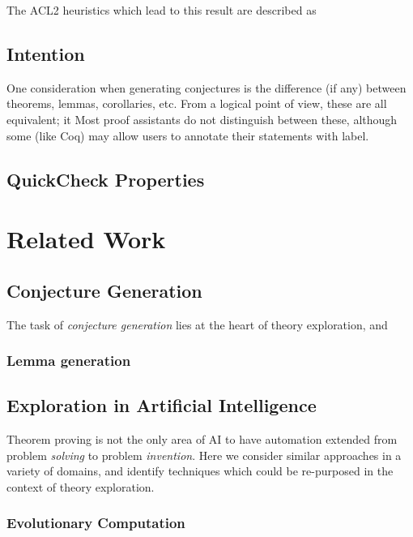 \documentclass[]{article}
\begin{document}
The ACL2 heuristics which lead to this result are described as

\subsection{Intention}

One consideration when generating conjectures is the difference (if any) between theorems, lemmas, corollaries, etc. From a logical point of view, these are all equivalent; it Most proof assistants do not distinguish between these, although some (like Coq) may allow users to annotate their statements with label.

\subsection{QuickCheck Properties}



\section{Related Work}
\label{related}

\subsection{Conjecture Generation}

The task of \emph{conjecture generation} lies at the heart of theory exploration, and

\subsubsection{Lemma generation}

\subsection{Exploration in Artificial Intelligence}

Theorem proving is not the only area of AI to have automation extended from problem \emph{solving} to problem \emph{invention}. Here we consider similar approaches in a variety of domains, and identify techniques which could be re-purposed in the context of theory exploration.

\subsubsection{Evolutionary Computation}
\end{document}
